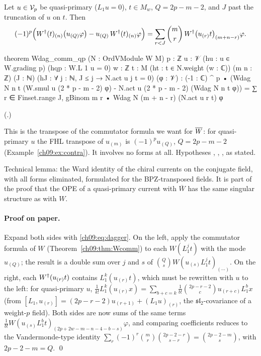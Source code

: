 \begin{theorem}\label{ch09:thm:Wdagcomm}
Let $u\in\mathcal{V}_p$ be quasi-primary ($L_1u=0$), $t\in M_w$, $Q=2p-m-2$, and $J$ past the
truncation of $u$ on $t$. Then
\begin{equation*}
(-1)^p\Big(W^{\dagger}(t)_{(n)}\big(u_{(Q)}\varphi\big)-u_{(Q)}\,W^{\dagger}(t)_{(n)}\varphi\Big)
=\sum_{r<J}\binom mr\,W^{\dagger}\big(u_{(r)}t\big)_{(m+n-r)}\varphi .
\end{equation*}
\end{theorem}
\begin{leancode}
theorem Wdag_comm_qp (N : OrdVModule W M) {p : ℤ} {u : 𝒱} (hu : u ∈ W.grading p)
    (hqp : W.L 1 u = 0) {w : ℤ} {t : M} (ht : t ∈ N.weight (w : ℂ)) (m n : ℤ) (J : ℕ)
    (hJ : ∀ j : ℕ, J ≤ j → N.act u j t = 0) (φ : 𝒱) :
    (-1 : ℂ) ^ p • (Wdag N n t (W.smul u (2 * p - m - 2) φ)
        - N.act u (2 * p - m - 2) (Wdag N n t φ))
      = ∑ r ∈ Finset.range J, gBinom m r • Wdag N (m + n - r) (N.act u r t) φ
\end{leancode}
(.)
\begin{dictionary}
This is the transpose of the commutator formula we want for $\overline{W}$: for quasi-primary $u$ the
FHL transpose of $u_{(m)}$ is $(-1)^pu_{(Q)}$, $Q=2p-m-2$ (Example~\ref{ch09:ex:contra}). It
involves no forms at all. Hypotheses , , ,  as stated.
\end{dictionary}
\begin{physics}
Technical lemma: the Ward identity of the chiral currents on the conjugate field, with all forms eliminated, formulated for the BPZ-transposed fields. It is part of the proof that the OPE of a quasi-primary current with $\overline W$ has the same singular structure as with $W$.
\end{physics}

\paragraph{Proof on paper.} Expand both sides with \eqref{ch09:eq:dagger}. On the left, apply the
commutator formula of $W$ (Theorem~\ref{ch09:thm:Wcomm}) to each $W(L_1^jt)$ with the mode $u_{(Q)}$;
the result is a double sum over $j$ and $s$ of $\binom Qs W(u_{(s)}L_1^jt)_{(\cdots)}$. On the right,
each $W^{\dagger}(u_{(r)}t)$ contains $L_1^k(u_{(r)}t)$, which must be rewritten with $u$ to the left:
for quasi-primary $u$,
$\frac1{k!}L_1^k(u_{(r)}x)=\sum_{b+c=k}\frac1{b!}\binom{2p-r-2}{c}u_{(r+c)}L_1^bx$ (from
$[L_1,u_{(r)}]=(2p-r-2)u_{(r+1)}+(L_1u)_{(r)}$, the $\mathfrak{sl}_2$-covariance of a weight-$p$ field).
Both sides are now sums of the same terms $\frac1{b!}W(u_{(s)}L_1^bt)_{(2p+2w-m-n-4-b-s)}\varphi$, and
comparing coefficients reduces to the Vandermonde-type identity
$\sum_{r}(-1)^r\binom mr\binom{2p-2-r}{s-r}=\binom{2p-2-m}{s}$, with $2p-2-m=Q$. \qed

